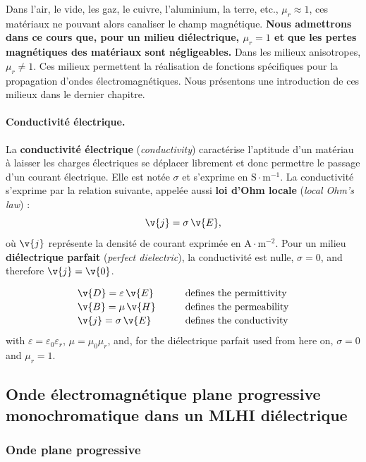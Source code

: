 Dans l'air, le vide, les gaz, le cuivre, l'aluminium, la terre, etc.,
$\mu_r \approx 1$, ces matériaux ne pouvant alors canaliser le champ
magnétique. \textbf{Nous admettrons dans ce cours que, pour un milieu
diélectrique, $\mu_r = 1$ et que les pertes magnétiques des matériaux sont
négligeables.} Dans les milieux anisotropes, $\mu_r \ne 1$. Ces milieux
permettent la réalisation de fonctions spécifiques pour la propagation d'ondes
électromagnétiques. Nous présentons une introduction de ces milieux dans le
dernier chapitre.

\paragraph{Conductivité électrique.}
La \textbf{conductivité électrique} (\textit{conductivity}) caractérise
l'aptitude d'un matériau à laisser les charges électriques se déplacer
librement et donc permettre le passage d'un courant électrique. Elle est notée
$\sigma$ et s'exprime en $\text{S}\cdot\text{m}^{-1}$. La conductivité
s'exprime par la relation suivante, appelée aussi \textbf{loi d'Ohm locale}
(\textit{local Ohm's law}) :
\[
  \v{j} = \sigma\,\v{E},
\]
où $\v{j}$ représente la densité de courant exprimée en
$\text{A}\cdot\text{m}^{-2}$. Pour un milieu \textbf{diélectrique parfait}
(\textit{perfect dielectric}), la conductivité est nulle, $\sigma = 0$, and
therefore $\v{j} = \v{0}$.

\begin{conclusion}
  \[
    \begin{array}{lll}
      \v{D} = \varepsilon\,\v{E} & \quad & \text{defines the permittivity} \\[2pt]
      \v{B} = \mu\,\v{H}         & \quad & \text{defines the permeability} \\[2pt]
      \v{j} = \sigma\,\v{E}      & \quad & \text{defines the conductivity}
    \end{array}
  \]
  with $\varepsilon = \varepsilon_0\varepsilon_r$, $\mu = \mu_0\mu_r$, and, for
  the diélectrique parfait used from here on, $\sigma = 0$ and $\mu_r = 1$.
\end{conclusion}

\subsection{Onde électromagnétique plane progressive monochromatique dans un MLHI diélectrique}

\subsubsection{Onde plane progressive}

